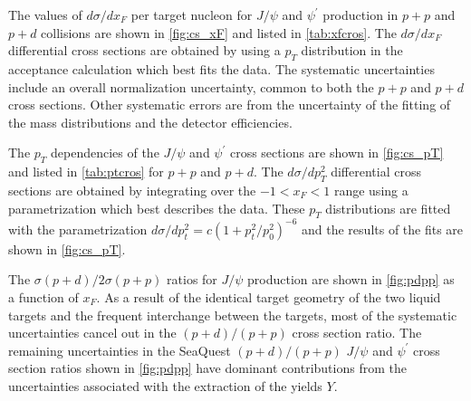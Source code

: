 \documentclass[reprint,aps,unsortedaddress,superscriptaddress,prd,floatfix,showpacs,linenumbers]{revtex4-2}
\begin{document}
The values of $d\sigma/ d x_F$ per target nucleon for $J/\psi$ and
$\psi^\prime$ production in $p+p$ and $p+d$ collisions are shown in 
\cref{fig:cs_xF} and listed
in \cref{tab:xfcros}. The $d\sigma/ d x_F$ differential cross sections are
obtained by using a $p_T$ distribution in the acceptance calculation
which best fits the data. The systematic uncertainties
include an overall normalization
uncertainty, common to both the $p+p$ and $p+d$ cross sections.
Other systematic errors are from the uncertainty of the fitting 
of the mass distributions and the detector efficiencies.

\begin{table}
  \caption{The differential cross sections per nucleon, $d\sigma/dx_F$
(in \unit{\nano\barn}),
for $J/\psi$ and $\psi^\prime$ production in $p+p$ and $p+d$
collisions at 120 GeV for different $x_F$ bins.
The statistical and the systematic uncertainties are also shown.}
	\begin{center}
	  \label{tab:xfcros}
  
  \end{center}
\end{table}

The $p_T$ dependencies of the $J/\psi$ and $\psi^\prime$
cross sections are shown in \cref{fig:cs_pT} and listed in \cref{tab:ptcros} 
for $p+p$ and $p+d$. The $d \sigma / d p_T^2$ differential
cross sections are obtained by integrating over the $-1<x_F<1$ range
using a parametrization which best describes the data.
These $p_T$ distributions are fitted with
the parametrization $d\sigma/dp_t^2 = c (1+p_t^2/p_0^2)^{-6}$\cite{kaplan1978}
and the results of the fits are shown in \cref{fig:cs_pT}.

\begin{table}
  \caption{The differential cross sections per nucleon, $d\sigma / dp^2_T$
 (in \unit{\nano\barn\per\GeV\squared}),
for charmonium production in $p+p$ and $p+d$
collisions at 120 GeV for different $p_T$ bins. 
The statistical and the systematic uncertainties are also shown.}
  \label{tab:ptcros}
  \begin{center}

  \end{center}
\end{table}

The $\sigma(p+d)/2\sigma(p+p)$ ratios for $J/\psi$ production are shown in 
\cref{fig:pdpp} as a function of $x_F$.
As a result of the identical target geometry
of the two liquid targets and the frequent interchange between the targets,
most of the systematic uncertainties cancel out in the 
$(p+d)/(p+p)$ cross section ratio. The remaining uncertainties in the 
SeaQuest $(p+d)/(p+p)$ $J/\psi$
and $\psi^\prime$ cross section 
ratios shown in \cref{fig:pdpp} have dominant contributions from the uncertainties
associated with the extraction of the yields $Y$.
\end{document}
